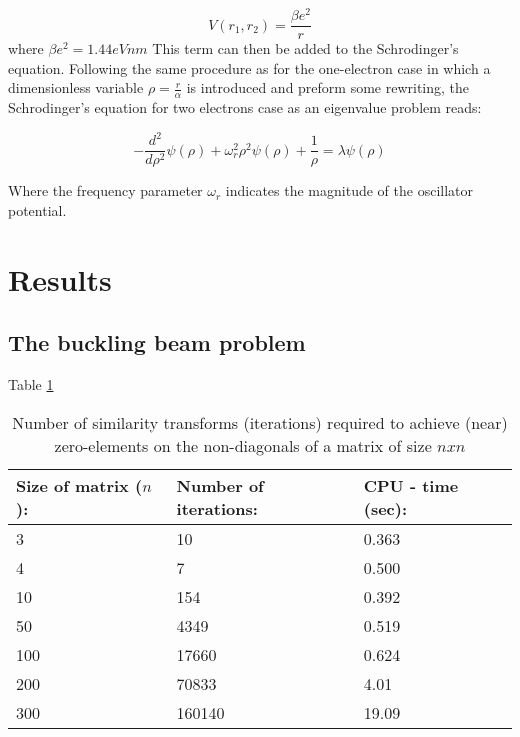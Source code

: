\documentclass{article}
\begin{document}
\begin{equation}
V(r_1,r_2) = \frac{\beta e^2}{r}
\end{equation}
where $ \beta e^2 = 1.44 eVnm$
This term can then be added to the Schrodinger's equation. Following the same procedure as for the one-electron case in which a dimensionless variable $\rho = \frac{r}{\alpha}$ is introduced and preform some rewriting, the Schrodinger's equation for two electrons case as an eigenvalue problem reads:

\begin{equation}
    -\frac{d^2}{d\rho^2}\psi(\rho) + \omega_{r}^2\rho^2\psi(\rho) + \frac{1}{\rho} = \lambda\psi(\rho)
\end{equation}

Where the frequency parameter $\omega_r{}$ indicates the magnitude of the oscillator potential. 



\medskip 




\section{Results}\label{sec:res}

\subsection{The buckling beam problem}\label{sec:bbp}

Table \ref{tab:1}

\begin{table}[]
\begin{tabular}{lll}
\textbf{Size of matrix ($n$):} & \textbf{Number of iterations:} & \textbf{CPU - time (sec):} \\ \hline
3                             & 10                            & 0.363                     \\
4                             & 7                             & 0.500                     \\
10                            & 154                           & 0.392                     \\
50                            & 4349                          & 0.519                     \\
100                           & 17660                         & 0.624                     \\
200                           & 70833                         & 4.01                      \\
300                           & 160140                        & 19.09                    
\end{tabular}
\label{tab:1}
\caption{Number of similarity transforms (iterations) required to achieve (near) zero-elements on the non-diagonals of a matrix of size $nxn$}
\end{table}
\end{document}
